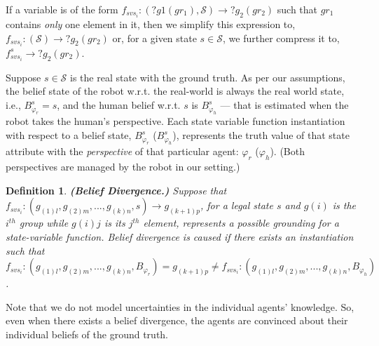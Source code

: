 \documentclass[letterpaper]{article} %
\newtheorem{definition}{Definition}
\begin{document}
If a variable is of the form $f_{svs_i}: (?g1 (gr_1), \mathcal{S}) \rightarrow ?g_2 (gr_2)$ such that $gr_1$ contains \textit{only} one element in it, then we simplify this expression to, $f_{svs_i}: (\mathcal{S}) \rightarrow ?g_2 (gr_2)$ or, for a given state $s \in \mathcal{S}$, we further compress it to, $f_{svs_i}^{s} \rightarrow ?g_2 (gr_2)$. 

Suppose $s \in \mathcal{S}$ is the real state with the ground truth. As per our assumptions, the belief state of the robot w.r.t. the real-world is always the real world state, i.e., $B_{\varphi_r}^s = s$, and the human belief w.r.t. $s$ is $B_{\varphi_h}^s$ --- that is estimated when the robot takes the human's perspective. Each state variable function instantiation with respect to a belief state, $B_{\varphi_r}^s$ ($B_{\varphi_h}^s$), represents the truth value of that state attribute with the \textit{perspective} of that particular agent: $\varphi_r$ ($\varphi_h$). (Both perspectives are managed by the robot in our setting.) 

\begin{definition}
\textbf{(Belief Divergence.)}
Suppose that $f_{\textit{svs}_i}:(g_{(1)l},g_{(2)m},...,g_{(k)n},s) \rightarrow g_{(k+1)p}$, for a legal state $s$ and $g(i)$ is the $i^{th}$ group while $g(i)j$ is its $j^{th}$ element, represents a possible {\em grounding} for a state-variable function.
Belief divergence is caused if there exists an instantiation such that $f_{\textit{svs}_i}:(g_{(1)l},g_{(2)m},...,g_{(k)n},B_{\varphi_r}) = {g_{(k+1)p}}  \neq f_{\textit{svs}_i}:(g_{(1)l},g_{(2)m},...,g_{(k)n},B_{\varphi_h})$.
\end{definition} 
Note that we do not model uncertainties in the individual agents' knowledge. So, even when there exists a belief divergence, the agents are convinced about their individual beliefs of the ground truth.
\end{document}
